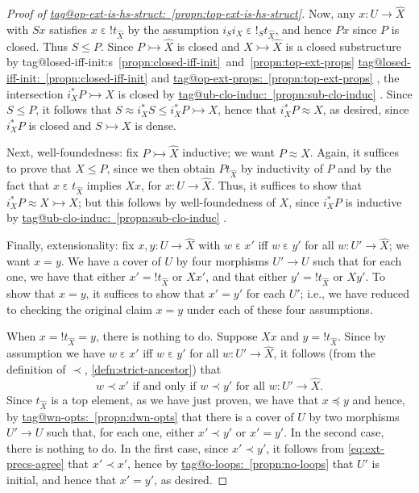 \documentclass{amsart}
\makeatletter
\newcommand\ein{\mathrel{\varepsilon}}
\newcommand\FORALL{\text{ for all }}
\newcommand\IFF{\text{ if and only if }}
\newcommand\tto{\rightarrowtail}
\newcommand\unex{{!}}
\newcommand\wh[1]{\widehat{#1}}
\newcommand\tagword[1]{\csname tag@#1\endcsname}
\def\label@tag#1:#2\@nil{#1}
\newcommand\labeltag[1]{\label@tag#1:\@nil}
\newcommand\jref[1]{%
  \texorpdfstring%
    {\hyperref[#1]{\tagword{\labeltag{#1}}~\ref*{#1}}}%
    {\tagword{\labeltag{#1}}~\ref*{#1}}%
}
\newcommand\jrefs[2]{%
  \ifthenelse{\equal{\labeltag{#1}}{\labeltag{#2}}}%
  {%
    \texorpdfstring%
      {\tagword{\labeltag{#1}}s~\ref{#1}~and~\ref{#2}}%
      {\tagword{\labeltag{#1}}s~\ref*{#1}~and~\ref*{#2}}%
  }{\jref{#1} and \jref{#2}}%
}
\theoremstyle{definition}
\theoremstyle{remark}
\theoremstyle{plainwithref}
\makeatother
\begin{document}
\begin{proof}[Proof of \jref{propn:top-ext-is-hs-struct}]
  Now, any \( x \colon U \to \wh X \) with \( S x \) satisfies \( x \ein \unex t_{\wh X} \) by the assumption \( i_S i_X \ein \unex_S t_{\wh X} \), and hence \( P x \) since \( P \) is closed.
  Thus \( S \le P \).
  Since \( P \tto \wh X \) is closed and \( X \tto \wh X \) is a closed substructure by \jrefs{propn:closed-iff-init}{propn:top-ext-props}, the intersection \( i_X^* P \tto X \) is closed by \jref{propn:sub-clo-induc}.
  Since \( S \le P \), it follows that \( S \approx i_X^* S \le i_X^* P \tto X \), hence that \( i_X^* P \approx X \), as desired, since \( i_X^* P \) is closed and \( S \tto X \) is dense.

  Next, well-foundedness: fix \( P \tto \wh X \) inductive; we want \( P \approx \wh X \).
  Again, it suffices to prove that \( X \le P \), since we then obtain \( P t_{\wh X} \) by inductivity of \( P \) and by the fact that \( x \ein t_{\wh X} \) implies \( X x \), for \( x \colon U \to \wh X \).
  Thus, it suffices to show that \( i_X^* P \approx X \tto X \); but this follows by well-foundedness of \( X \), since \( i_X^* P \) is inductive by \jref{propn:sub-clo-induc}.

  Finally, extensionality: fix \( x,y \colon U \to \wh X \) with \( w \ein x' \) iff \( w \ein y' \) for all \( w \colon U' \to \wh X \); we want \( x = y \).
  We have a cover of \( U \) by four morphisms \( U' \to U \) such that for each one, we have that either \( x' = \unex t_{\wh X} \) or \( X x' \), and that either \( y' = \unex t_{\wh X} \) or \( X y' \).
  To show that \( x = y \), it suffices to show that \( x' = y' \) for each \( U' \); i.e., we have reduced to checking the original claim \( x = y \) under each of these four assumptions.

  When \( x = \unex t_{\wh X} = y \), there is nothing to do.
  Suppose \( X x \) and \( y = \unex t_{\wh X} \).
  Since by assumption we have \( w \ein x' \) iff \( w \ein y' \) for all \( w \colon U' \to \wh X \), it follows (from the definition of \( \prec \), \ref{defn:strict-ancestor}) that
  \begin{equation} \label{eq:ext-precs-agree}
    w \prec x'
    \IFF
    w \prec y'
    \FORALL
    w \colon U' \to \wh X.
  \end{equation}
  Since \( t_{\wh X} \) is a top element, as we have just proven, we have that \( x \preceq y \) and hence, by \jref{propn:dwn-opts} that there is a cover of \( U \) by two morphisms \( U' \to U \) such that, for each one, either \( x' \prec y' \) or \( x' = y' \).
  In the second case, there is nothing to do.
  In the first case, since \( x' \prec y' \), it follows from \eqref{eq:ext-precs-agree} that \( x' \prec x' \), hence by \jref{propn:no-loops} that \( U' \) is initial, and hence that \( x' = y' \), as desired.


\end{proof}
\end{document}
